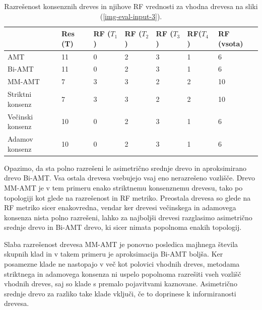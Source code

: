 \documentclass[a4paper, 12pt]{book}
\begin{document}
\begin{table}[h!]
	\begin{center}
	{\footnotesize
	\begin{tabular}{ l| l | l | l | l | l | l }
	~                & Res (T)      & RF ($T_1$) & RF ($T_2$)       & RF ($T_3$) & RF($T_4$) & RF (vsota) \\ \hline
	AMT              & 11          & 0          & 2                & 3          & 1         & 6          \\ \hline
	Bi-AMT           & 11          & 0          & 2                & 3          & 1         & 6          \\ \hline
	MM-AMT           & 7           & 3          & 3                & 2          & 2         & 10         \\ \hline
	Striktni konsenz & 7           & 3          & 3                & 2          & 2         & 10         \\ \hline
	Večinski konsenz & 10          & 0          & 2                & 3          & 1         & 6          \\ \hline
	Adamov konsenz   & 10          & 0          & 2                & 3          & 1         & 6          \\ \hline
	\end{tabular}
	\caption{Razrešenost konsenznih dreves in njihove RF vrednosti za vhodna drevesa na sliki (\ref{img-eval-input-3}).}
	}
	\label{table-eval-3}
	\end{center}		
\end{table}

Opazimo, da sta polno razrešeni le asimetrično srednje drevo in aproksimirano drevo Bi-AMT. Vsa ostala drevesa vsebujejo vsaj eno nerazrešeno vozlišče. Drevo MM-AMT je v tem primeru enako striktnemu konsenznemu drevesu, tako po topologiji kot glede na razrešenost in RF metriko. Preostala drevesa so glede na RF metriko sicer enakovredna, vendar ker drevesi večinskega in adamovega konsenza nista polno razrešeni, lahko za najboljši drevesi razglasimo asimetrično srednje drevo in Bi-AMT drevo, ki sicer nimata popolnoma enakih topologij.

Slaba razrešenost drevesa MM-AMT je ponovno posledica majhnega števila skupnih klad in v takem primeru je aproksimacija Bi-AMT boljša. Ker posamezne klade ne nastopajo v več kot polovici vhodnih dreves, metodama striktnega in adamovega konsenza ni uspelo popolnoma razrešiti vseh vozlišč vhodnih dreves, saj so klade s premalo pojavitvami kaznovane. Asimetrično srednje drevo za razliko take klade vključi, če to doprinese k informiranosti drevesa.
\end{document}
